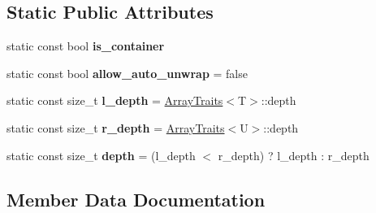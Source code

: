 \subsection*{Static Public Attributes}
\begin{DoxyCompactItemize}
\item 
static const bool {\bfseries is\+\_\+container}
\item 
\mbox{\label{classgnuplotio_1_1ArrayTraits_3_01std_1_1pair_3_01T_00_01U_01_4_01_4_afff9ebffb39ab8660bb59ffcc7d8a2e5}} 
static const bool {\bfseries allow\+\_\+auto\+\_\+unwrap} = false
\item 
\mbox{\label{classgnuplotio_1_1ArrayTraits_3_01std_1_1pair_3_01T_00_01U_01_4_01_4_ae8be9661c88a8970da3d87c1afc063dc}} 
static const size\+\_\+t {\bfseries l\+\_\+depth} = \mbox{\hyperlink{classgnuplotio_1_1ArrayTraits}{Array\+Traits}}$<$T$>$\+::depth
\item 
\mbox{\label{classgnuplotio_1_1ArrayTraits_3_01std_1_1pair_3_01T_00_01U_01_4_01_4_a1b7e7f8976a5d0ed20b93ede3e25a546}} 
static const size\+\_\+t {\bfseries r\+\_\+depth} = \mbox{\hyperlink{classgnuplotio_1_1ArrayTraits}{Array\+Traits}}$<$U$>$\+::depth
\item 
\mbox{\label{classgnuplotio_1_1ArrayTraits_3_01std_1_1pair_3_01T_00_01U_01_4_01_4_a11b3be89ac9506fcfcceb318acc7e2bf}} 
static const size\+\_\+t {\bfseries depth} = (l\+\_\+depth $<$ r\+\_\+depth) ? l\+\_\+depth \+: r\+\_\+depth
\end{DoxyCompactItemize}


\subsection{Member Data Documentation}
\mbox{\label{classgnuplotio_1_1ArrayTraits_3_01std_1_1pair_3_01T_00_01U_01_4_01_4_a8656ab8094037d88b470f718ff7197e0}} 
